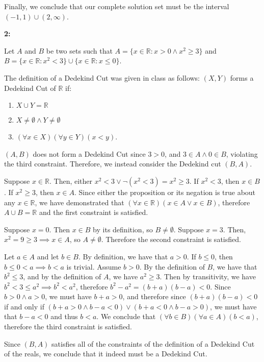 \documentclass{article}
\newcommand{\reals}{\mathbb{R}}
\begin{document}
Finally, we conclude that our complete solution set
must be the interval $(-1,1) \cup (2, \infty)$.

\medskip
\textbf{2:}

Let $A$ and $B$ be two sets such that
$A = \{x \in \reals: x > 0 \land x^2 \geq 3\}$
and $B = \{x \in \reals: x^2 < 3\} \cup \{x \in \reals: x \le 0\}$.

The definition of a Dedekind Cut was given in class as follows:
$(X,Y)$ forms a Dedekind Cut of $\reals$ if:
\begin{enumerate}
	\item
	$X \cup Y = \reals$
	\item
	$X \neq \emptyset \land Y \neq \emptyset$
	\item
	$(\forall x \in X)(\forall y \in Y)(x < y)$.
\end{enumerate}

\medskip
$(A,B)$ does not form a Dedekind Cut since $3 > 0$, and $3 \in A \land 0 \in B$,
violating the third constraint. Therefore, we instead consider the Dedekind cut $(B,A)$.


Suppose $x \in \reals$. Then, either $x^2 < 3 \lor \neg (x^2 < 3) = x^2 \geq 3$.
If $x^2 < 3$, then $x \in B$. If $x^2 \geq 3$, then $x \in A$.
Since either the proposition or its negation is true about any $x \in \reals$,
we have demonstrated that $(\forall x \in \reals)(x \in A \lor x \in B)$,
therefore $A \cup B = \reals$ and the first constraint is satisfied.

Suppose $x = 0$. Then $x \in B$ by its definition, so $B \neq \emptyset$.
Suppose $x = 3$. Then, $x^2 = 9  \geq 3 \implies x \in A$, so $A \neq \emptyset$.
Therefore the second constraint is satisfied.

Let $a \in A$ and let $b \in B$.
By definition, we have that $a > 0$.
If $b \leq 0$, then $b \leq 0 < a \implies b < a$ is trivial.
Assume $b > 0$. By the definition of $B$, we have that $b^2 \leq 3$,
and by the definition of $A$, we have $a^2 \geq 3$.
Then by transitivity, we have $b^2 < 3 \le a^2 \implies b^2 < a^2$,
therefore $b^2 - a^2 = (b+a)(b-a) < 0$.
Since $b > 0 \land a > 0$, we must have $b + a > 0$,
and therefore since $(b+a)(b-a) < 0$ if and only if
$(b+a > 0 \land b-a < 0) \lor (b + a < 0 \land b - a > 0)$,
we must have that $b-a < 0$ and thus $b < a$.
We conclude that $(\forall b \in B)(\forall a \in A)(b < a)$,
therefore the third constraint is satisfied.

Since $(B,A)$ satisfies all of the constraints of the definition
of a Dedekind Cut of the reals, we conclude that it indeed must be a Dedekind Cut.
\end{document}
